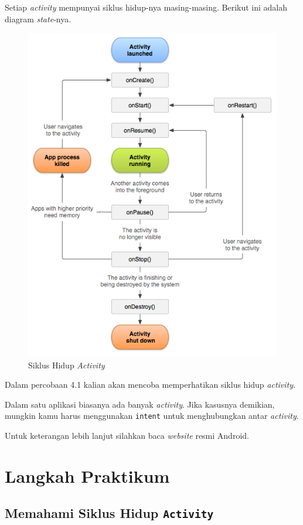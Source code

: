 \documentclass{scrartcl}
\begin{document}
Setiap \textit{activity} mempunyai siklus hidup-nya masing-masing. Berikut ini adalah diagram \textit{state}-nya.

\begin{figure}[htbp]
	\centering
	\includegraphics[width=0.7\linewidth]{screenshot001}
	\caption{Siklus Hidup \textit{Activity}}
	\label{fig:screenshot001}
\end{figure}

Dalam percobaan 4.1 kalian akan mencoba memperhatikan siklus hidup \textit{activity}.

Dalam satu aplikasi biasanya ada banyak \textit{activity}. Jika kasusnya demikian, mungkin kamu harus menggunakan \texttt{intent} untuk menghubungkan antar \textit{activity}.

Untuk keterangan lebih lanjut silahkan baca \textit{website} resmi Android.


\section{Langkah Praktikum}

\subsection{Memahami Siklus Hidup \texttt{Activity}}
\end{document}
